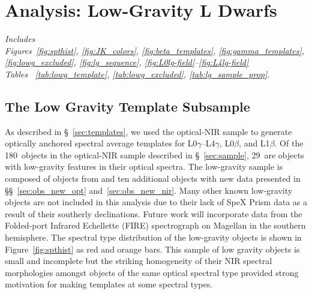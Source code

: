 \documentclass[12pt,preprint]{aastex}
\newcommand{\sample}{180}
\newcommand{\optLowG}{29}
\begin{document}


\clearpage
\section{Analysis: Low-Gravity L Dwarfs}
\label{sec:lowg}

\emph{Includes \\
Figures~\ref{fig:spthist}, \ref{fig:JK_colors}, \ref{fig:beta_templates}, \ref{fig:gamma_templates}, \ref{fig:lowg_excluded}, \ref{fig:lg_sequence}, \ref{fig:L0lg-field}--\ref{fig:L4lg-field}\\
Tables ~\ref{tab:lowg_template}, \ref{tab:lowg_excluded}, \ref{tab:lg_sample_prop}.}

\subsection{The Low Gravity Template Subsample}
\label{sec:templates_lowg}

As described in \S~\ref{sec:templates}, we used the optical-NIR sample to generate optically anchored spectral average templates for L0$\gamma$--L4$\gamma$, L0$\beta$, and L1$\beta$.
Of the \sample~objects in the optical-NIR sample described in \S~\ref{sec:sample}, \optLowG~are objects with low-gravity features in their optical spectra.
The low-gravity sample is composed of objects from \citet{Cruz07,Kirkpatrick08,Cruz09_lowg} and ten additional objects with new data presented in \S\S~\ref{sec:obs_new_opt} and~\ref{sec:obs_new_nir}.
Many other known low-gravity objects are not included in this analysis due to their lack of SpeX Prism data as a result of their southerly declinations. 
Future work will incorporate data from the Folded-port Infrared Echellette (FIRE) spectrograph on Magellan \citep{Simcoe:2013kh} in the southern hemisphere.
The spectral type distribution of the low-gravity objects is shown in Figure~\ref{fig:spthist} as red and orange bars.
This sample of low gravity objects is small and incomplete but the striking homogeneity of their NIR spectral morphologies amongst objects of the same optical spectral type provided strong motivation for making templates at some spectral types.
\end{document}

